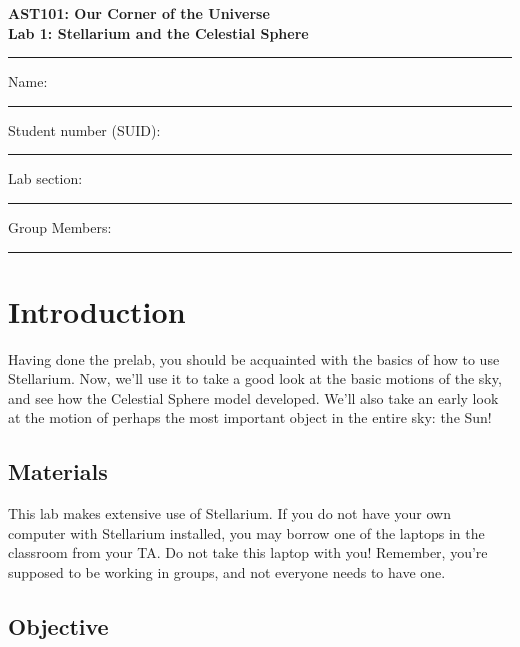 \documentclass[11pt]{article}
\begin{document}


\begin{center}
\textbf{\Large
AST101: Our Corner of the Universe \\
\vspace*{0.1cm}
Lab 1: Stellarium and the Celestial Sphere
}
\end{center}

\vspace*{0.5cm}

\hrule
{\Large Name:}\vspace*{0.5cm}\\\hrule
{\Large Student number (SUID):}\vspace*{0.5cm}\\\hrule
{\Large Lab section:}\vspace*{0.5cm}\\\hrule
{\Large Group Members:}\vspace*{0.5cm}\\\hrule
\vspace*{0.5cm}

\section{Introduction}

Having done the prelab, you should be acquainted with the basics of how to use Stellarium. Now, we'll use it to take a good look at the basic motions of the sky, and see how the Celestial Sphere model developed. We'll also take an early look at the motion of perhaps the most important object in the entire sky: the Sun!

\subsection*{Materials}

This lab makes extensive use of Stellarium. If you do not have your own computer with Stellarium installed, you may borrow one of the laptops in the classroom from your TA. Do not take this laptop with you! Remember, you're supposed to be working in groups, and not everyone needs to have one.

\subsection*{Objective}
\end{document}
